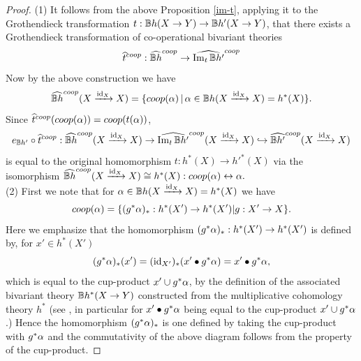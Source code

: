 \documentclass[a4paper]{amsart}
\begin{document}
\begin{proof} 

(1) It follows from the above Proposition \ref{im-t}, applying it to the Grothendieck transformation $t:\mathbb B h(X \to Y) \to \mathbb B h'(X \to Y)$, that there exists a Grothendieck transformation of co-operational bivariant theories
$$\widehat t^{coop}: \widehat{\mathbb B h}^{coop} \to \widehat{\operatorname{Im}_t\mathbb B h'}^{coop}$$
Now by the above construction we have
$$\widehat{\mathbb B h}^{coop} (X \xrightarrow {\operatorname{id}_X} X) = \{ coop(\alpha) \, | \, \alpha \in \mathbb B h(X \xrightarrow {\operatorname{id}_X} X) =h^*(X) \}.$$
Since $\widehat t^{coop}(coop(\alpha)) =coop(t(\alpha))$, 
$$e_{\mathbb B h'} \circ \widehat t^{coop}:\widehat{\mathbb B h}^{coop} (X \xrightarrow {\operatorname{id}_X} X)  \to \widehat{\operatorname{Im}_t \mathbb B h'}^{coop}(X \xrightarrow {\operatorname{id}_X} X) \hookrightarrow \widehat{\mathbb B h'}^{coop} (X \xrightarrow {\operatorname{id}_X} X) $$
 is equal to the original homomorphism  $t: h^*(X) \to h'^*(X)$ 
via the isomorphism 
$\widehat{\mathbb B h}^{coop} (X \xrightarrow {\operatorname{id}_X} X) \cong h^*(X): coop(\alpha) \leftrightarrow \alpha.$\\


(2) First we note that for $ \alpha \in \mathbb B h(X \xrightarrow {\operatorname{id}_X} X) =h^*(X)$ we have
$$coop(\alpha)= \{(g^*\alpha)_* : h^*(X') \to h^*(X') | g:X' \to X \}.$$
Here we emphasize that the homomorphism $(g^*\alpha)_* : h^*(X') \to h^*(X')$ is defined by, for $x' \in h^*(X')$
$$(g^*\alpha)_*(x')=(\operatorname{id}_{X'})_*(x' \bullet g^*\alpha) = x' \bullet g^*\alpha,$$
which is equal to the cup-product $x' \cup g^*\alpha$, by the definition of the associated bivariant theory $\mathbb B h^*(X \to Y)$ constructed from the multiplicative cohomology theory $h^*$ (see \cite[\S 3.1.4 - \S 3.1.9]{FM}, in particular \cite[\S 3.1.7]{FM} for $x' \bullet g^*\alpha$ being equal to the cup-product $x' \cup g^*\alpha$.)  Hence the homomorphism $(g^*\alpha)_*$ is one defined by taking the cup-product with $g^*\alpha$ and the commutativity of the above diagram follows from the property of the cup-product.

\end{proof}
\end{document}
